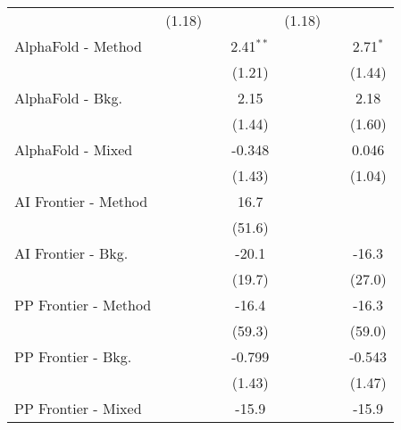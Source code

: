 \begin{tabular}{lcccccc}
                                & (1.18)         &              &              & (1.18)         &              &   \\   
   AlphaFold - Method           &                &              & 2.41$^{**}$  &                &              & 2.71$^{*}$\\   
                                &                &              & (1.21)       &                &              & (1.44)\\   
   AlphaFold - Bkg.             &                &              & 2.15         &                &              & 2.18\\   
                                &                &              & (1.44)       &                &              & (1.60)\\   
   AlphaFold - Mixed            &                &              & -0.348       &                &              & 0.046\\   
                                &                &              & (1.43)       &                &              & (1.04)\\   
   AI Frontier - Method         &                &              & 16.7         &                &              &   \\   
                                &                &              & (51.6)       &                &              &   \\   
   AI Frontier - Bkg.           &                &              & -20.1        &                &              & -16.3\\   
                                &                &              & (19.7)       &                &              & (27.0)\\   
   PP Frontier - Method         &                &              & -16.4        &                &              & -16.3\\   
                                &                &              & (59.3)       &                &              & (59.0)\\   
   PP Frontier - Bkg.           &                &              & -0.799       &                &              & -0.543\\   
                                &                &              & (1.43)       &                &              & (1.47)\\   
   PP Frontier - Mixed          &                &              & -15.9        &                &              & -15.9\\   

\end{tabular}
